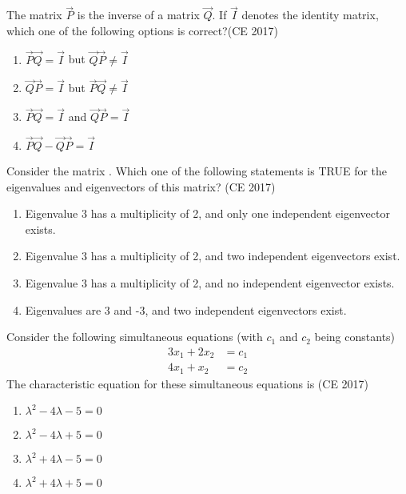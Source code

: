     \item The matrix $\vec{P}$ is the inverse of a matrix $\vec{Q}$. If $\vec{I}$ denotes the identity matrix, which one of the following options is correct?\hfill (CE 2017)
    \begin{multicols}{2}
    \begin{enumerate}
        \item $\vec{P}\vec{Q} = \vec{I}$ but $\vec{Q}\vec{P} \neq \vec{I}$
        \item $\vec{Q}\vec{P} = \vec{I}$ but $\vec{P}\vec{Q} \neq \vec{I}$
        \item $\vec{P}\vec{Q} = \vec{I}$ and $\vec{Q}\vec{P} = \vec{I}$
        \item $\vec{P}\vec{Q} - \vec{Q}\vec{P} = \vec{I}$
    \end{enumerate}
    \end{multicols}
    \item Consider the matrix . Which one of the following statements is TRUE for the eigenvalues and eigenvectors of this matrix? \hfill (CE 2017)
    \begin{enumerate}
        \item Eigenvalue 3 has a multiplicity of 2, and only one independent eigenvector exists.
        \item Eigenvalue 3 has a multiplicity of 2, and two independent eigenvectors exist.
        \item Eigenvalue 3 has a multiplicity of 2, and no independent eigenvector exists.
        \item Eigenvalues are 3 and -3, and two independent eigenvectors exist.
    \end{enumerate}
    \item Consider the following simultaneous equations (with $c_1$ and $c_2$ being constants)
    \begin{align*}
3x_1 + 2x_2 &= c_1
\\
4x_1 + x_2  &= c_2
    \end{align*}
    The characteristic equation for these simultaneous equations is
    \hfill (CE 2017)
    \begin{multicols}{2}
    \begin{enumerate}
        \item $\lambda^2 - 4\lambda - 5 = 0$  
        \item $\lambda^2 - 4\lambda + 5 = 0$  
        \item $\lambda^2 + 4\lambda - 5 = 0$  
        \item $\lambda^2 + 4\lambda + 5 = 0$  
    \end{enumerate}
    \end{multicols}
